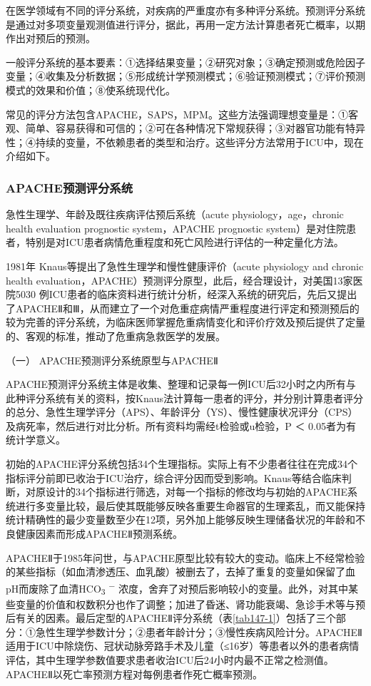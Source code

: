 在医学领域有不同的评分系统，对疾病的严重度亦有多种评分系统。预测评分系统是通过对多项变量观测值进行评分，据此，再用一定方法计算患者死亡概率，以期作出对预后的预测。

一般评分系统的基本要素：①选择结果变量；②研究对象；③确定预测或危险因子变量；④收集及分析数据；⑤形成统计学预测模式；⑥验证预测模式；⑦评价预测模式的效果和价值；⑧使系统现代化。

常见的评分方法包含APACHE，SAPS，MPM。这些方法强调理想变量是：①客观、简单、容易获得和可信的；②可在各种情况下常规获得；③对器官功能有特异性；④持续的变量，不依赖患者的类型和治疗。这些评分方法常用于ICU中，现在介绍如下。

\subsubsection{APACHE预测评分系统}

急性生理学、年龄及既往疾病评估预后系统（acute physiology，age，chronic
health evaluation prognostic system，APACHE prognostic
system）是对住院患者，特别是对ICU患者病情危重程度和死亡风险进行评估的一种定量化方法。

1981年 Knaus等提出了急性生理学和慢性健康评价（acute physiology and
chronic health
evaluation，APACHE）预测评分原型，此后，经合理设计，对美国13家医院5030
例ICU患者的临床资料进行统计分析，经深入系统的研究后，先后又提出了APACHEⅡ和Ⅲ，从而建立了一个对危重症病情严重程度进行评定和预测预后的较为完善的评分系统，为临床医师掌握危重病情变化和评价疗效及预后提供了定量的、客观的标准，推动了危重病急救医学的发展。

\hypertarget{text00401.htmlux5cux23CHP16-14-1-1-1}{}
（一） APACHE预测评分系统原型与APACHEⅡ

APACHE预测评分系统主体是收集、整理和记录每一例ICU后32小时之内所有与此种评分系统有关的资料，按Knaus法计算每一患者的评分，并分别计算患者评分的总分、急性生理学评分（APS）、年龄评分（YS）、慢性健康状况评分（CPS）及病死率，然后进行对比分析。所有资料均需经t检验或u检验，P
＜ 0.05者为有统计学意义。

初始的APACHE评分系统包括34个生理指标。实际上有不少患者往往在完成34个指标评分前即已收治于ICU治疗，综合评分因而受到影响。Knaus等结合临床判断，对原设计的34个指标进行筛选，对每一个指标的修改均与初始的APACHE系统进行多变量比较，最后使其既能够反映各重要生命器官的生理紊乱，而又能保持统计精确性的最少变量数至少在12项，另外加上能够反映生理储备状况的年龄和不良健康因素而形成APACHEⅡ预测系统。

APACHEⅡ于1985年问世，与APACHE原型比较有较大的变动。临床上不经常检验的某些指标（如血清渗透压、血乳酸）被删去了，去掉了重复的变量如保留了血pH而废除了血清HCO\textsubscript{3}
\textsuperscript{−}
浓度，舍弃了对预后影响较小的变量。此外，对其中某些变量的价值和权数积分也作了调整；加进了昏迷、肾功能衰竭、急诊手术等与预后有关的因素。最后定型的APACHEⅡ评分系统（表\ref{tab147-1}）包括了三个部分：①急性生理学参数计分；②患者年龄计分；③慢性疾病风险计分。APACHEⅡ适用于ICU中除烧伤、冠状动脉旁路手术及儿童（≤16岁）等患者以外的患者病情评估，其中生理学参数值要求患者收治ICU后24小时内最不正常之检测值。APACHEⅡ以死亡率预测方程对每例患者作死亡概率预测。

